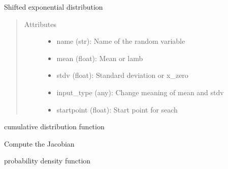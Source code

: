 \documentclass[letterpaper,10pt,english]{sphinxmanual}
\begin{document}
\begin{fulllineitems}
Shifted exponential distribution
\begin{quote}\begin{description}
\item[{Attributes }] \leavevmode\begin{itemize}
\item {} 
name (str):         Name of the random variable

\item {} 
mean (float):       Mean or lamb

\item {} 
stdv (float):       Standard deviation or x\_zero

\item {} 
input\_type (any):   Change meaning of mean and stdv

\item {} 
startpoint (float): Start point for seach

\end{itemize}

\end{description}\end{quote}


\begin{fulllineitems}
cumulative distribution function

\end{fulllineitems}



\begin{fulllineitems}
Compute the Jacobian

\end{fulllineitems}



\begin{fulllineitems}
probability density function


\end{fulllineitems}
\end{fulllineitems}
\end{document}
